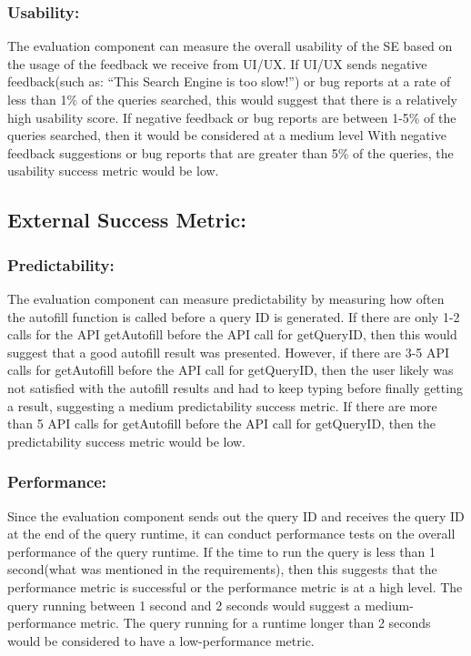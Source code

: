 \smallskip

\subsubsection*{Usability:}
The evaluation component can measure the overall usability of the SE based on the 
usage of the feedback we receive from UI/UX. If UI/UX sends negative feedback(such 
as: “This Search Engine is too slow!”) or bug reports at a rate of less than 1\% 
of the queries searched, this would suggest that there is a relatively high 
usability score. If negative feedback or bug reports are between 1-5\% of the 
queries searched, then it would be considered at a medium level With negative 
feedback suggestions or bug reports that are greater than 5\% of the queries, the 
usability success metric would be low.

\bigskip

\subsection*{External Success Metric:}

\medskip

\subsubsection*{Predictability:}

The evaluation component can measure predictability by measuring how often the 
autofill function is called before a query ID is generated. If there are only 1-2 
calls for the API getAutofill before the API call for getQueryID, then this would 
suggest that a good autofill result was presented. However, if there are 3-5 API 
calls for getAutofill before the API call for getQueryID, then the user likely was 
not satisfied with the autofill results and had to keep typing before finally 
getting a result, suggesting a medium predictability success metric. If there are 
more than 5 API calls for getAutofill before the API call for getQueryID, then the 
predictability success metric would be low.

\smallskip

\subsubsection*{Performance:}
Since the evaluation component sends out the query ID and receives the query ID at 
the end of the query runtime, it can conduct performance tests on the overall 
performance of the query runtime. If the time to run the query is less than 1 
second(what was mentioned in the requirements), then this suggests that the 
performance metric is successful or the performance metric is at a high level. The 
query running between 1 second and 2 seconds would suggest a medium-performance 
metric. The query running for a runtime longer than 2 seconds would be considered 
to have a low-performance metric. 

